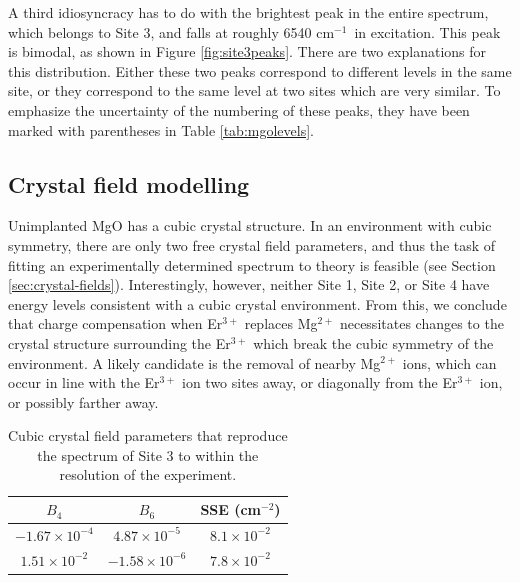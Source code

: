 \documentclass[12pt]{puthesis}
\newcommand{\erbium}[1][ ]{Er$^{3+}$#1}
\newcommand{\wn}{cm$^{-1}$}
\begin{document}
A third idiosyncracy has to do with the brightest peak in the entire spectrum, which belongs to Site 3, and falls at roughly 6540 \wn\ in excitation. This peak is bimodal, as shown in Figure \ref{fig:site3peaks}. There are two explanations for this distribution. Either these two peaks correspond to different levels in the same site, or they correspond to the same level at two sites which are very similar. To emphasize the uncertainty of the numbering of these peaks, they have been marked with parentheses in Table \ref{tab:mgolevels}.

\subsection{Crystal field modelling}
Unimplanted MgO has a cubic crystal structure. In an environment with cubic symmetry, there are only two free crystal field parameters, and thus the task of fitting an experimentally determined spectrum to theory is feasible (see Section \ref{sec:crystal-fields}). Interestingly, however, neither Site 1, Site 2, or Site 4 have energy levels consistent with a cubic crystal environment. From this, we conclude that charge compensation when \erbium replaces Mg$^{2+}$ necessitates changes to the crystal structure surrounding the \erbium which break the cubic symmetry of the environment. A likely candidate is the removal of nearby Mg$^{2+}$ ions, which can occur in line with the \erbium ion two sites away, or diagonally from the \erbium ion, or possibly farther away.

\begin{table}
  \centering
  \begin{tabular}{| c | c | c |}
    \hline
    $B_{4}$ & $B_{6}$ & SSE (cm$^{-2}$) \\
    \hline
    $-1.67\times 10^{-4}$ & $4.87\times 10^{-5}$ & $8.1\times 10^{-2}$ \\
    $1.51\times 10^{-2}$ & $-1.58\times 10^{-6}$ & $7.8\times 10^{-2}$\\
    \hline
  \end{tabular}
  \caption{Cubic crystal field parameters that reproduce the spectrum of Site 3 to within the resolution of the experiment.}
  \label{tab:crystalfieldparams}
\end{table}
\end{document}
